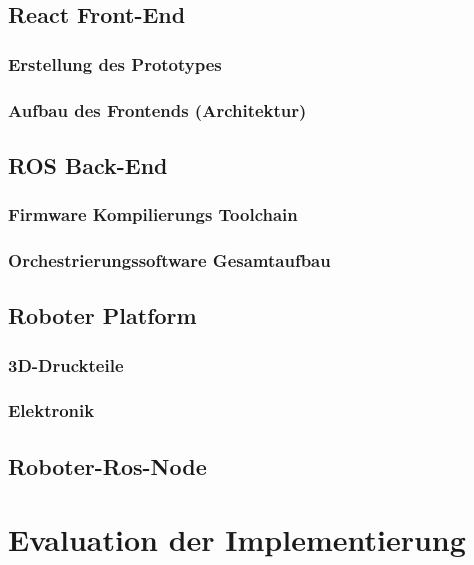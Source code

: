 \documentclass[11pt,oneside,a4paper,titlepage]{article}
\begin{document}
\subsection{React Front-End}

\subsubsection{Erstellung des Prototypes}


\subsubsection{Aufbau des Frontends (Architektur)}



\subsection{ROS Back-End}
\subsubsection{Firmware Kompilierungs Toolchain}


\subsubsection{Orchestrierungssoftware Gesamtaufbau}



\pagebreak
\subsection{Roboter Platform}
\subsubsection{3D-Druckteile}


\subsubsection{Elektronik}
\label{sec:electronic}


\subsection{Roboter-Ros-Node}



\section{Evaluation der Implementierung}
\end{document}
